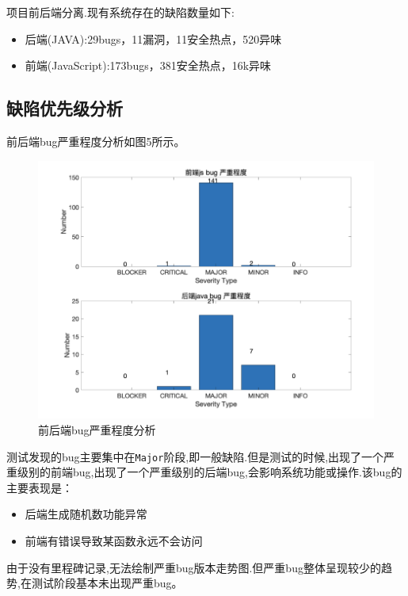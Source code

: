 \documentclass[hyperref, a4paper]{ctexart}
\providecommand{\tightlist}{%
  \setlength{\itemsep}{0pt}\setlength{\parskip}{0pt}}
\begin{document}
项目前后端分离.现有系统存在的缺陷数量如下:

\begin{itemize}
\tightlist
\item
  后端(JAVA):29bugs，11漏洞，11安全热点，520异味
\item
  前端(JavaScript):173bugs，381安全热点，16k异味
\end{itemize}

\hypertarget{ux7f3aux9677ux4f18ux5148ux7ea7ux5206ux6790}{%
\subsection{缺陷优先级分析}\label{ux7f3aux9677ux4f18ux5148ux7ea7ux5206ux6790}}

前后端bug严重程度分析如图5所示。

\begin{figure}
\centering
\includegraphics{pic/WechatIMG19439.png}
\caption{前后端bug严重程度分析}
\end{figure}

测试发现的bug主要集中在\texttt{Major}阶段,即一般缺陷.但是测试的时候,出现了一个严重级别的前端bug,出现了一个严重级别的后端bug,会影响系统功能或操作.该bug的主要表现是：

\begin{itemize}
\tightlist
\item
  后端生成随机数功能异常
\item
  前端有错误导致某函数永远不会访问
\end{itemize}

由于没有里程碑记录,无法绘制严重bug版本走势图.但严重bug整体呈现较少的趋势,在测试阶段基本未出现严重bug。
\end{document}
